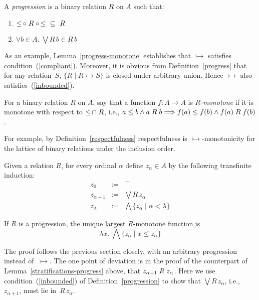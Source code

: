 \documentclass{CSML}
\theoremstyle{definition}
\newcommand{\progress}{\rightarrowtail}
\begin{document}
\begin{defi}
\label{progression}
A {\em progression} is a binary relation $R$ on $A$ such that:
\begin{enumerate}
\item
\label{compliant}
$\mathop{\leq} \circ \R \circ \mathop{\leq} \ \subseteq\ R$
\item
\label{inbounded}
$\forall b \in A.\; \bigvee R\,b \in R\,b$
\end{enumerate}
\end{defi}

As an example, Lemma~\ref{progress-monotone} establishes that
$\progress$ satisfies condition~(\ref{compliant}).  Moreover, it is
obvious from Definition~\ref{progress} that for any relation~$S$,
$\{R\mid R \progress S\}$ is closed under arbitrary union.  Hence
$\progress$ also satisfies~(\ref{inbounded}).

\begin{defi}
\label{Rmonotone}
For a binary relation $R$ on $A$, say that a function $f\colon A
\rightarrow A$ is {\em $R$-monotone} if it is monotone with respect to
$\mathop{\leq} \cap \mathrel{R}$, i.e., $a \leq b \wedge a\mathrel{R} b \Longrightarrow
f(a) \leq f(b) \wedge f(a)\mathrel{R} f(b)$.
\end{defi}

For example, by Definition~\ref{respectfulness} respectfulness is
$\progress$-monotonicity for the lattice of binary relations under the
inclusion order.

\begin{defi}
\label{general-stratification}
Given a relation $R$, for every ordinal $\alpha$ define $z_\alpha \in
A$ by the following transfinite induction:
\[\begin{array}{lcl}
z_0  & := & \top \\
z_{\alpha+1} & := & \bigvee R\, z_\alpha \\
z_\lambda  & := & \bigwedge \{z_\alpha \mid \alpha < \lambda\}
\end{array}\]
\end{defi}

\begin{thm}
\label{general-theorem}
If $R$ is a progression, the unique largest $R$-monotone function is
\[\lambda x.\; \bigwedge \{z_\alpha \mid x \leq z_\alpha\}\]
\end{thm}

The proof follows the previous section closely, with an arbitrary
progression instead of~$\progress$. The one point of deviation is in
the proof of the counterpart of Lemma~\ref{stratifications-progress}
above, that $z_{\alpha+1} \mathrel{R} z_\alpha$. Here we use
condition~(\ref{inbounded}) of Definition~\ref{progression} to show
that $\bigvee R\, z_\alpha$, i.e., $z_{\alpha+1}$, must lie in~$R\,
z_\alpha$.
\end{document}
